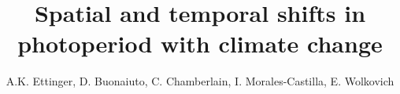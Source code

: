 \documentclass{article}
\begin{document}


\title{Spatial and temporal shifts in photoperiod with climate change} %

\author{A.K. Ettinger, D. Buonaiuto, C. Chamberlain, I. Morales-Castilla, E. Wolkovich}
\date{}
\maketitle  %



\end{document}

